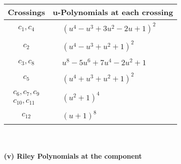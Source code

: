 \documentclass[1p]{elsarticle_modified}
\theoremstyle{definition}
\begin{document}
\begin{tabular}{m{50pt}|m{274pt}}
Crossings & \hspace{64pt}u-Polynomials at each crossing \\
\hline $$\begin{aligned}c_{1},c_{4}\end{aligned}$$&$\begin{aligned}
&(u^4- u^3+3 u^2-2 u+1)^2
\end{aligned}$\\
\hline $$\begin{aligned}c_{2}\end{aligned}$$&$\begin{aligned}
&(u^4- u^3+u^2+1)^2
\end{aligned}$\\
\hline $$\begin{aligned}c_{3},c_{8}\end{aligned}$$&$\begin{aligned}
&u^8-5 u^6+7 u^4-2 u^2+1
\end{aligned}$\\
\hline $$\begin{aligned}c_{5}\end{aligned}$$&$\begin{aligned}
&(u^4+u^3+u^2+1)^2
\end{aligned}$\\
\hline $$\begin{aligned}c_{6},c_{7},c_{9}\\c_{10},c_{11}\end{aligned}$$&$\begin{aligned}
&(u^2+1)^4
\end{aligned}$\\
\hline $$\begin{aligned}c_{12}\end{aligned}$$&$\begin{aligned}
&(u+1)^8
\end{aligned}$\\
\hline
\end{tabular}\\~\\
\newpage\renewcommand{\arraystretch}{1}
\flushleft \textbf{(v) Riley Polynomials at the component}\newline \\
\end{document}
